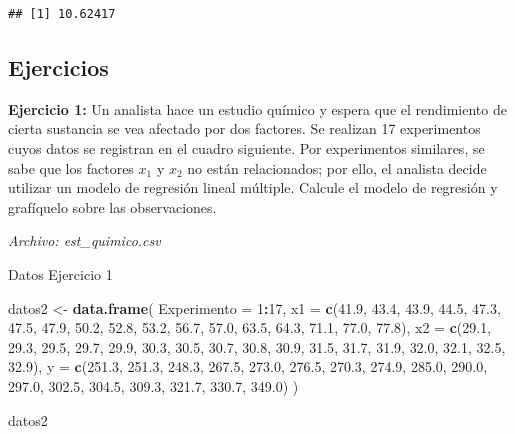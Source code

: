 \documentclass[
]{book}
\newenvironment{Shaded}{\begin{snugshade}}{\end{snugshade}}
\newcommand{\AttributeTok}[1]{\textcolor[rgb]{0.13,0.29,0.53}{#1}}
\newcommand{\DecValTok}[1]{\textcolor[rgb]{0.00,0.00,0.81}{#1}}
\newcommand{\FloatTok}[1]{\textcolor[rgb]{0.00,0.00,0.81}{#1}}
\newcommand{\FunctionTok}[1]{\textcolor[rgb]{0.13,0.29,0.53}{\textbf{#1}}}
\newcommand{\NormalTok}[1]{#1}
\newcommand{\OtherTok}[1]{\textcolor[rgb]{0.56,0.35,0.01}{#1}}
\newcommand{\SpecialCharTok}[1]{\textcolor[rgb]{0.81,0.36,0.00}{\textbf{#1}}}
\begin{document}
\begin{verbatim}
## [1] 10.62417
\end{verbatim}

\subsection{Ejercicios}\label{ejercicios}

\textbf{Ejercicio 1:} Un analista hace un estudio químico y espera que el rendimiento de cierta sustancia se vea afectado por dos factores. Se realizan 17 experimentos cuyos datos se registran en el cuadro siguiente. Por experimentos similares, se sabe que los factores \(x_1\) y \(x_2\) no están relacionados; por ello, el analista decide utilizar un modelo de regresión lineal múltiple. Calcule el modelo de regresión y grafíquelo sobre las observaciones.

\emph{Archivo: est\_quimico.csv}

Datos Ejercicio 1

\begin{Shaded}
\begin{Highlighting}[]
\NormalTok{datos2 }\OtherTok{\textless{}{-}} \FunctionTok{data.frame}\NormalTok{(}
  \AttributeTok{Experimento =} \DecValTok{1}\SpecialCharTok{:}\DecValTok{17}\NormalTok{,}
  \AttributeTok{x1 =} \FunctionTok{c}\NormalTok{(}\FloatTok{41.9}\NormalTok{, }\FloatTok{43.4}\NormalTok{, }\FloatTok{43.9}\NormalTok{, }\FloatTok{44.5}\NormalTok{, }\FloatTok{47.3}\NormalTok{, }\FloatTok{47.5}\NormalTok{, }\FloatTok{47.9}\NormalTok{, }\FloatTok{50.2}\NormalTok{, }\FloatTok{52.8}\NormalTok{, }\FloatTok{53.2}\NormalTok{, }\FloatTok{56.7}\NormalTok{, }\FloatTok{57.0}\NormalTok{, }\FloatTok{63.5}\NormalTok{, }\FloatTok{64.3}\NormalTok{, }\FloatTok{71.1}\NormalTok{, }\FloatTok{77.0}\NormalTok{, }\FloatTok{77.8}\NormalTok{),}
  \AttributeTok{x2 =} \FunctionTok{c}\NormalTok{(}\FloatTok{29.1}\NormalTok{, }\FloatTok{29.3}\NormalTok{, }\FloatTok{29.5}\NormalTok{, }\FloatTok{29.7}\NormalTok{, }\FloatTok{29.9}\NormalTok{, }\FloatTok{30.3}\NormalTok{, }\FloatTok{30.5}\NormalTok{, }\FloatTok{30.7}\NormalTok{, }\FloatTok{30.8}\NormalTok{, }\FloatTok{30.9}\NormalTok{, }\FloatTok{31.5}\NormalTok{, }\FloatTok{31.7}\NormalTok{, }\FloatTok{31.9}\NormalTok{, }\FloatTok{32.0}\NormalTok{, }\FloatTok{32.1}\NormalTok{, }\FloatTok{32.5}\NormalTok{, }\FloatTok{32.9}\NormalTok{),}
  \AttributeTok{y  =} \FunctionTok{c}\NormalTok{(}\FloatTok{251.3}\NormalTok{, }\FloatTok{251.3}\NormalTok{, }\FloatTok{248.3}\NormalTok{, }\FloatTok{267.5}\NormalTok{, }\FloatTok{273.0}\NormalTok{, }\FloatTok{276.5}\NormalTok{, }\FloatTok{270.3}\NormalTok{, }\FloatTok{274.9}\NormalTok{, }\FloatTok{285.0}\NormalTok{, }\FloatTok{290.0}\NormalTok{, }\FloatTok{297.0}\NormalTok{, }\FloatTok{302.5}\NormalTok{, }\FloatTok{304.5}\NormalTok{, }\FloatTok{309.3}\NormalTok{, }\FloatTok{321.7}\NormalTok{, }\FloatTok{330.7}\NormalTok{, }\FloatTok{349.0}\NormalTok{)}
\NormalTok{)}

\NormalTok{datos2}
\end{Highlighting}
\end{Shaded}
\end{document}
